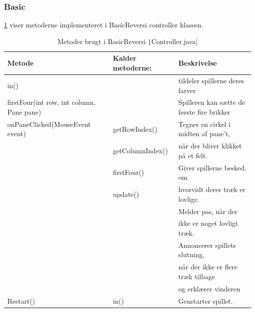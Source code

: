 \subsubsection{Basic}
\cref{tbl:1} viser metoderne implementeret i BasicReversi controller klassen.
\begin{table}[H]
    \centering
    \caption{Metoder brugt i BasicReversi \texttt|Controller.java|}\label{tbl:1}
    \begin{tabular}{lll}
        \toprule
        Metode                                    & Kalder metoderne: & Beskrivelse                                          \\
        \midrule
        in()                                      &                   & tildeler spillerne deres farver                      \\
        firstFour(int row, int column, Pane pane) &                   & Spilleren kan sætte de første fire brikker           \\
        onPaneClicked(MouseEvent event)           & getRowIndex()     & Tegner en cirkel i midten af pane't,                 \\
                                                  & getColumnIndex()  & når der bliver klikket på et felt.                   \\
                                                  & firstFour()       & Giver spillerne besked, om                           \\
                                                  & update()          & hvorvidt deres træk er lovlige.                      \\
                                                  &                   & Melder pas, når der                                  \\
                                                  &                   & ikke er noget lovligt træk.                          \\
                                                  &                   & Annoncerer spillets slutning,                        \\
                                                  &                   & når der ikke er flere træk tilbage                   \\
                                                  &                   & og erklærer vinderen                                 \\
        Restart()                                 & in()              & Genstarter spillet.                                  \\

\end{tabular}
\end{table}
